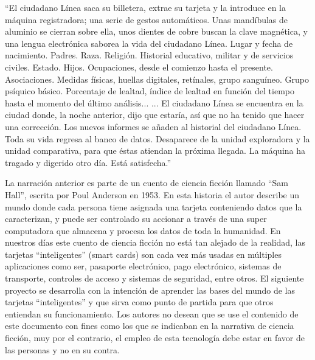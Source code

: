 \begin{prefacio}

\begin{itshape}
“El ciudadano Línea saca su billetera, extrae su tarjeta y la introduce en la máquina registradora; una serie de gestos automáticos. Unas mandíbulas de aluminio se cierran sobre ella, unos dientes de cobre buscan la clave magnética, y una lengua electrónica saborea la vida del ciudadano Línea.
Lugar y fecha de nacimiento. Padres. Raza. Religión. Historial educativo, militar y de servicios civiles. Estado. Hijos. Ocupaciones, desde el comienzo hasta el presente. Asociaciones. Medidas físicas, huellas digitales, retínales, grupo sanguíneo. Grupo psíquico básico. Porcentaje de lealtad, índice de lealtad en función del tiempo hasta el momento del último análisis...
... El ciudadano Línea se encuentra en la ciudad donde, la noche anterior, dijo que estaría, así que no ha tenido que hacer una corrección.
Los nuevos informes se añaden al historial del ciudadano Línea. Toda su vida regresa al banco de datos. Desaparece de la unidad exploradora y la unidad comparativa, para que éstas atiendan la próxima llegada.
La máquina ha tragado y digerido otro día. Está satisfecha.”

\end{itshape}
\bigskip

La narración anterior es parte de un cuento de ciencia ficción llamado “Sam Hall”, escrita por Poul Anderson en 1953. En esta historia el autor describe un mundo donde cada persona tiene asignada una tarjeta conteniendo datos que la caracterizan, y puede ser controlado su accionar a través de una super computadora que almacena y procesa los datos de toda la humanidad. 
En nuestros días este cuento de ciencia ficción no está tan alejado de la realidad, las tarjetas “inteligentes” (smart cards) son cada vez más usadas en múltiples aplicaciones como ser, pasaporte electrónico, pago electrónico, sistemas de transporte, controles de acceso y sistemas de seguridad, entre otros.
El siguiente proyecto se desarrolla con la intención de aprender las bases del mundo de las tarjetas “inteligentes” y que sirva como punto de partida para que otros entiendan su funcionamiento. 
Los autores no desean que se use el contenido de este documento con fines como los que se indicaban en la narrativa de ciencia ficción, muy por el contrario, el empleo de esta tecnología debe estar en favor de las personas y no en su contra.

\end{prefacio}